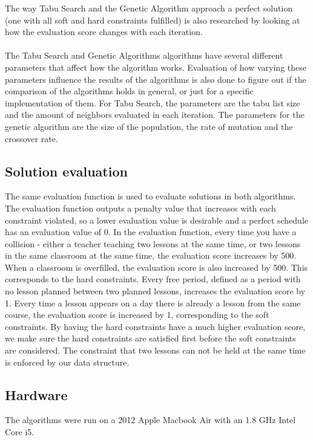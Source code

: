 \documentclass[titlepage,a4paper]{article}
\begin{document}
The way Tabu Search and the Genetic Algorithm approach a perfect solution (one with all soft and hard constraints fulfilled) is also researched by looking at how the evaluation score changes with each iteration. \\\\
The Tabu Search and Genetic Algorithms algorithms have several different parameters that affect how the algorithm works. Evaluation of how varying these parameters influence the results of the algorithms is also done to figure out if the comparison of the algorithms holds in general, or just for a specific implementation of them.
For Tabu Search, the parameters are the tabu list size and the amount of neighbors evaluated in each iteration. 
The parameters for the genetic algorithm are the size of the population, the rate of mutation and the crossover rate.

\subsection{Solution evaluation}
The same evaluation function is used to evaluate solutions in both algorithms. The evaluation function outputs a penalty value that increases with each constraint violated, so a lower evaluation value is desirable and a perfect schedule has an evaluation value of 0. In the evaluation function, every time you have a collision - either a teacher teaching two lessons at the same time, or two lessons in the same classroom at the same time, the evaluation score increases by 500. When a classroom is overfilled, the evaluation score is also increased by 500. This corresponds to the hard constraints. Every free period, defined as a period with no lesson planned between two planned lessons, increases the evaluation score by 1. Every time a lesson appears on a day there is already a lesson from the same course, the evaluation score is increased by 1, corresponding to the soft constraints. By having the hard constraints have a much higher evaluation score, we make sure the hard constraints are satisfied first before the soft constraints are considered. The constraint that two lessons can not be held at the same time is enforced by our data structure.

\subsection{Hardware}
The algorithms were run on a 2012 Apple Macbook Air with an 1.8 GHz Intel Core i5.

\pagebreak
\end{document}
